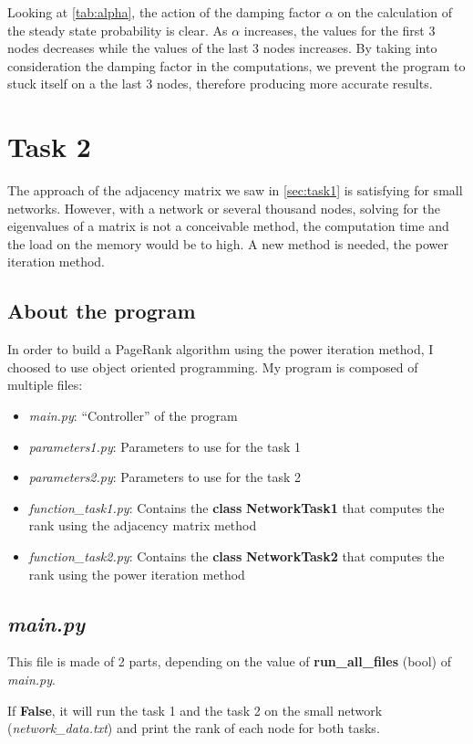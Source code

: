 Looking at \autoref{tab:alpha}, the action of the damping factor $\alpha$ on the calculation of the steady state probability is clear. As $\alpha$ increases, the values for the first 3 nodes decreases while the values of the last 3 nodes increases. By taking into consideration the damping factor in the computations, we prevent the program to stuck itself on a the last 3 nodes, therefore producing more accurate results.
\section{Task 2}
The approach of the adjacency matrix we saw in \autoref{sec:task1} is satisfying for small networks. However, with a network or several thousand nodes, solving for the eigenvalues of a matrix is not a conceivable method, the computation time and the load on the memory would be to high. A new method is needed, the power iteration method.

\subsection{About the program}
    In order to build a PageRank algorithm using the power iteration method, I choosed to use object oriented programming. My program is composed of multiple files:
    \begin{itemize}
        \item \textit{main.py}: ``Controller'' of the program
        \item \textit{parameters1.py}: Parameters to use for the task 1
        \item \textit{parameters2.py}: Parameters to use for the task 2
        \item \textit{function\_task1.py}: Contains the \textbf{class} \textbf{NetworkTask1} that computes the rank using the adjacency matrix method
        \item \textit{function\_task2.py}: Contains the \textbf{class} \textbf{NetworkTask2} that computes the rank using the power iteration method
    \end{itemize}

\subsection{\textit{main.py}}
This file is made of 2 parts, depending on the value of \textbf{run\_all\_files} (bool) of \textit{main.py}.

If \textbf{False}, it will run the task 1 and the task 2 on the small network (\textit{network\_data.txt}) and print the rank of each node for both tasks.

